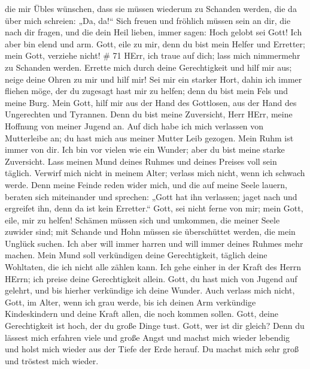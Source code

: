 die mir Übles wünschen,  dass sie müssen wiederum zu
Schanden werden, die da über mich schreien: „Da, da!{}`` 
Sich freuen und fröhlich müssen sein an dir, die nach dir fragen, und
die dein Heil lieben, immer sagen: Hoch gelobt sei Gott! 
Ich aber bin elend und arm. Gott, eile zu mir, denn du bist mein Helfer
und Erretter; mein Gott, verziehe nicht! \# 71  HErr, ich
traue auf dich; lass mich nimmermehr zu Schanden werden. 
Errette mich durch deine Gerechtigkeit und hilf mir aus; neige deine
Ohren zu mir und hilf mir!  Sei mir ein starker Hort, dahin
ich immer fliehen möge, der du zugesagt hast mir zu helfen; denn du bist
mein Fels und meine Burg.  Mein Gott, hilf mir aus der Hand
des Gottlosen, aus der Hand des Ungerechten und Tyrannen. 
Denn du bist meine Zuversicht, Herr HErr, meine Hoffnung von meiner
Jugend an.  Auf dich habe ich mich verlassen von Mutterleibe
an; du hast mich aus meiner Mutter Leib gezogen. Mein Ruhm ist immer von
dir.  Ich bin vor vielen wie ein Wunder; aber du bist meine
starke Zuversicht.  Lass meinen Mund deines Ruhmes und
deines Preises voll sein täglich.  Verwirf mich nicht in
meinem Alter; verlass mich nicht, wenn ich schwach werde. 
Denn meine Feinde reden wider mich, und die auf meine Seele lauern,
beraten sich miteinander  und sprechen: „Gott hat ihn
verlassen; jaget nach und ergreifet ihn, denn da ist kein Erretter.``
 Gott, sei nicht ferne von mir; mein Gott, eile, mir zu
helfen!  Schämen müssen sich und umkommen, die meiner Seele
zuwider sind; mit Schande und Hohn müssen sie überschüttet werden, die
mein Unglück suchen.  Ich aber will immer harren und will
immer deines Ruhmes mehr machen.  Mein Mund soll
verkündigen deine Gerechtigkeit, täglich deine Wohltaten, die ich nicht
alle zählen kann.  Ich gehe einher in der Kraft des Herrn
HErrn; ich preise deine Gerechtigkeit allein.  Gott, du
hast mich von Jugend auf gelehrt, und bis hierher verkündige ich deine
Wunder.  Auch verlass mich nicht, Gott, im Alter, wenn ich
grau werde, bis ich deinen Arm verkündige Kindeskindern und deine Kraft
allen, die noch kommen sollen.  Gott, deine Gerechtigkeit
ist hoch, der du große Dinge tust. Gott, wer ist dir gleich?
 Denn du lässest mich erfahren viele und große Angst und
machst mich wieder lebendig und holst mich wieder aus der Tiefe der Erde
herauf.  Du machst mich sehr groß und tröstest mich wieder.
